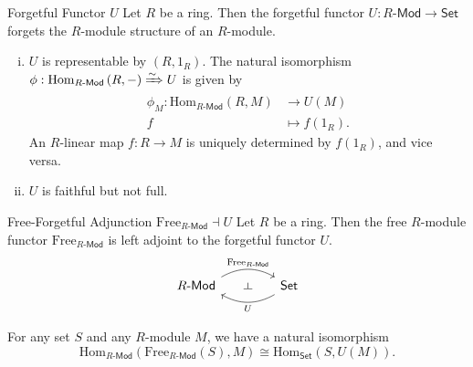 \begin{example}{Forgetful Functor $U$}{}
    Let $R$ be a ring. Then the forgetful functor $U:R\text{-}\mathsf{Mod}\to \mathsf{Set}$ forgets the $R$-module structure of an $R$-module. 
    \begin{enumerate}[(i)]
        \item $U$ is representable by $\left(R, 1_R\right)$. The natural isomorphism $\phi:\mathrm{Hom}_{R\text{-}\mathsf{Mod}}\left(R, -\right)\xRightarrow{\sim} U$ is given by 
        \begin{align*}
            \phi_M:\mathrm{Hom}_{R\text{-}\mathsf{Mod}}\left(R, M\right)&\longrightarrow U(M)\\
            f&\longmapsto f(1_R).
        \end{align*}
        An $R$-linear map $f:R\to M$ is uniquely determined by $f(1_R)$, and vice versa.
        \item $U$ is faithful but not full.
    \end{enumerate}
\end{example}
 

\begin{proposition}{Free-Forgetful Adjunction $\mathrm{Free}_{R\text{-}\mathsf{Mod}}\dashv U$}{}
    Let $R$ be a ring. Then the free $R$-module functor $\mathrm{Free}_{R\text{-}\mathsf{Mod}}$ is left adjoint to the forgetful functor $U$.
    \[
        \begin{tikzcd}[ampersand replacement=\&]
            R\text{-}\mathsf{Mod} \arrow[r, "\mathrm{Free}_{R\text{-}\mathsf{Mod}}"{name=U}, bend left, start anchor=east, yshift=1.7ex, end anchor=west] \&[+18pt] 
            \mathsf{Set} \arrow[l, "{U}"{name=D, anchor=north}, bend left, start anchor=west, yshift=-1.5ex, end anchor=east]
            \arrow[phantom, from=U, to=D, "\dashv"{rotate=-90}]
        \end{tikzcd}    
    \]
    
    For any set $S$ and any $R$-module $M$, we have a natural isomorphism
    \[
        \mathrm{Hom}_{R\text{-}\mathsf{Mod}}\left(\mathrm{Free}_{R\text{-}\mathsf{Mod}}(S), M\right)\cong \mathrm{Hom}_{\mathsf{Set}}\left(S, U(M)\right).
    \]
\end{proposition}


